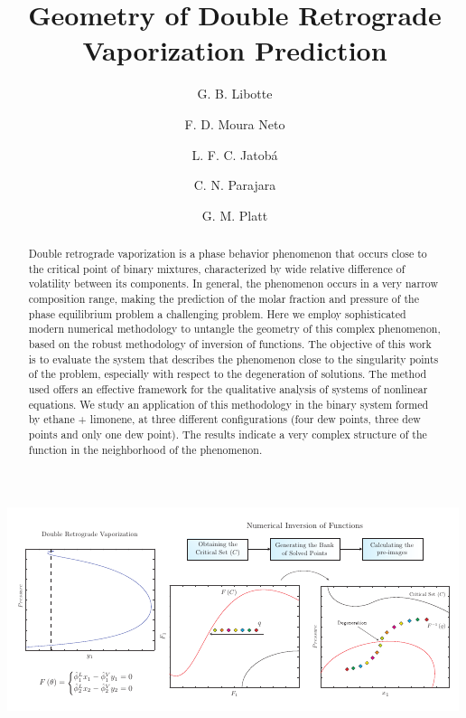 \documentclass[journal=iecred,manuscript=article]{achemso}
\author{G. B. Libotte}
\author{F. D. Moura Neto}
\author{L. F. C. Jatob\'{a}}
\author{C. N. Parajara}
\author{G. M. Platt}
\affiliation[Unknown University]
{Polytechnic Institute, Rio de Janeiro State University, Nova Friburgo, Brazil}
\title[An \textsf{achemso} demo]
  {Geometry of Double Retrograde Vaporization Prediction}
\theoremstyle{definition}
\theoremstyle{remark}
\begin{document}
\begin{tocentry}

		\includegraphics[scale=1]{graphical_abstract/graphical_abstract.pdf}

\end{tocentry}

\begin{abstract}
Double retrograde vaporization is a phase behavior phenomenon that occurs close to the critical point of binary mixtures, characterized by wide relative difference of volatility between its components. In general, the phenomenon occurs in a very narrow composition range, making the prediction of the molar fraction and pressure of the phase equilibrium problem a challenging problem. Here we employ sophisticated modern numerical methodology to untangle the geometry of this complex phenomenon, based on the robust methodology of inversion of functions. The objective of this work is to evaluate the system that describes the phenomenon close to the singularity points of the problem, especially with respect to the degeneration of solutions. The method used offers an effective framework for the qualitative analysis of systems of nonlinear equations. We study an application of this methodology in the binary system formed by ethane + limonene, at three different configurations (four dew points, three dew points and only one dew point). The results indicate a very complex structure of the function in the neighborhood of the phenomenon.
\end{abstract}
\end{document}
